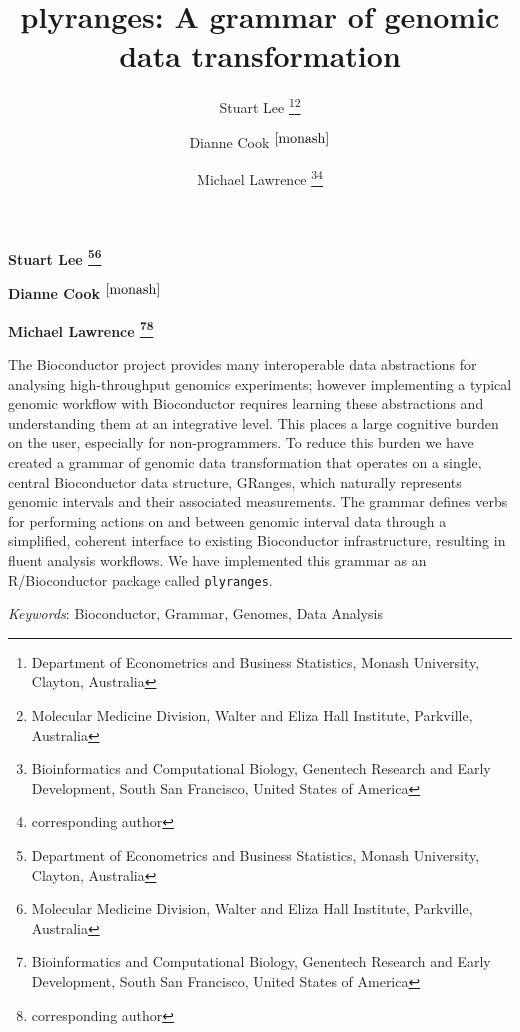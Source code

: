 \documentclass[]{article}
\title{plyranges: A grammar of genomic data transformation  }
\author{\Large Stuart Lee
\footnote{\label{monash}Department of Econometrics and Business Statistics, Monash University, Clayton, Australia}\footnote{Molecular Medicine Division, Walter and Eliza Hall Institute, Parkville, Australia}\vspace{0.05in} \newline\normalsize\emph{}   \and \Large Dianne Cook \(^{\ref{monash}}\)\vspace{0.05in} \newline\normalsize\emph{}   \and \Large Michael Lawrence
\footnote{Bioinformatics and Computational Biology, Genentech Research and Early Development, South San Francisco, United States of America}\footnote{corresponding author}\vspace{0.05in} \newline\normalsize\emph{}  }
\date{}
\newcommand*{\authorfont}{\fontfamily{phv}\selectfont}
\renewenvironment{abstract}
 {{%
    \setlength{\leftmargin}{0mm}
    \setlength{\rightmargin}{\leftmargin}%
  }%
  \relax}
 {\endlist}
\begin{document}
	
%

{%
\setlength{\parindent}{0pt}
\thispagestyle{plain}
{\fontsize{18}{20}\selectfont\raggedright 
\maketitle  %

}

{
   \vskip 13.5pt\relax \normalsize\fontsize{11}{12} 
\textbf{\authorfont Stuart Lee
\footnote{\label{monash}Department of Econometrics and Business Statistics, Monash University, Clayton, Australia}\footnote{Molecular Medicine Division, Walter and Eliza Hall Institute, Parkville, Australia}} \hskip 15pt \emph{\small }   \par \textbf{\authorfont Dianne Cook \(^{\ref{monash}}\)} \hskip 15pt \emph{\small }   \par \textbf{\authorfont Michael Lawrence
\footnote{Bioinformatics and Computational Biology, Genentech Research and Early Development, South San Francisco, United States of America}\footnote{corresponding author}} \hskip 15pt \emph{\small }   

}

}








\begin{abstract}

    \hbox{\vrule height .2pt width 39.14pc}

    \vskip 8.5pt %

\noindent The Bioconductor project provides many interoperable data abstractions
for analysing high-throughput genomics experiments; however implementing
a typical genomic workflow with Bioconductor requires learning these
abstractions and understanding them at an integrative level. This places
a large cognitive burden on the user, especially for non-programmers. To
reduce this burden we have created a grammar of genomic data
transformation that operates on a single, central Bioconductor data
structure, GRanges, which naturally represents genomic intervals and
their associated measurements. The grammar defines verbs for performing
actions on and between genomic interval data through a simplified,
coherent interface to existing Bioconductor infrastructure, resulting in
fluent analysis workflows. We have implemented this grammar as an
R/Bioconductor package called \texttt{plyranges}.


\vskip 8.5pt \noindent \emph{Keywords}: Bioconductor, Grammar, Genomes, Data Analysis \par

    \hbox{\vrule height .2pt width 39.14pc}



\end{abstract}
\end{document}
